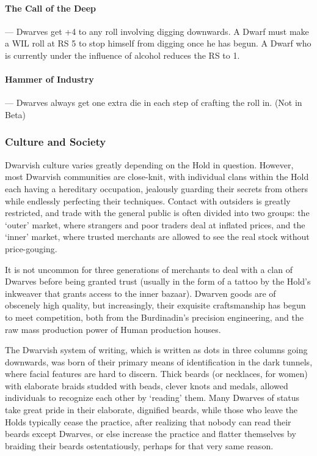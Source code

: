 \documentclass[oneside,11pt,english]{book}
\begin{document}
\paragraph{The Call of the Deep}---\quad
Dwarves get +4 to any roll involving digging downwards. A Dwarf must make a WIL roll at RS 5 
to stop himself from digging once he has begun. A Dwarf who is currently under the influence of 
alcohol reduces the RS to 1. 
\paragraph{Hammer of Industry}---\quad
Dwarves always get one extra die in each step of crafting the roll in. (Not in Beta) 
\subsubsection*{Culture and Society}
Dwarvish culture varies greatly depending on the Hold in question. However, most Dwarvish 
communities are close-knit, with individual clans within the Hold each having a hereditary occupation, 
jealously guarding their secrets from others while endlessly perfecting their techniques. Contact with 
outsiders is greatly restricted, and trade with the general public is often divided into two groups: the 
‘outer’ market, where strangers and poor traders deal at inflated prices, and the ‘inner’ market, where 
trusted merchants are allowed to see the real stock without price-gouging. 


It is not uncommon for three generations of merchants to deal with a clan of Dwarves before being 
granted trust (usually in the form of a tattoo by the Hold's inkweaver that grants access to the inner 
bazaar). Dwarven goods are of obscenely high quality, but increasingly, their exquisite craftsmanship has 
begun to meet competition, both from the Burdinadin's precision engineering, and the raw mass 
production power of Human production houses. 


The Dwarvish system of writing, which is written as dots in three columns going downwards, was born of 
their primary means of identification in the dark tunnels, where facial features are hard to discern. Thick 
beards (or necklaces, for women) with elaborate braids studded with beads, clever knots and medals, 
allowed individuals to recognize each other by ‘reading’ them. Many Dwarves of status take great pride 
in their elaborate, dignified beards, while those who leave the Holds typically cease the practice, after 
realizing that nobody can read their beards except Dwarves, or else increase the practice and flatter 
themselves by braiding their beards ostentatiously, perhaps for that very same reason. 
\end{document}
